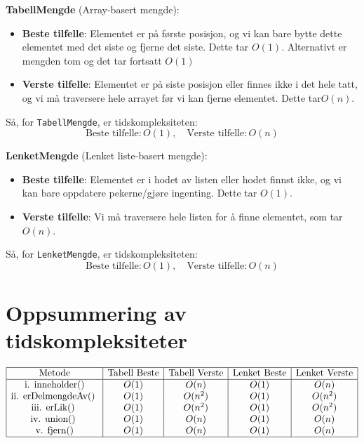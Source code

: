 \documentclass[12pt]{article}
\begin{document}
\textbf{TabellMengde} (Array-basert mengde):
\begin{itemize}
    \item \textbf{Beste tilfelle}: Elementet er på første posisjon,
        og vi kan bare bytte dette elementet med det siste og fjerne det siste. 
        Dette tar \(O(1)\). Alternativt er mengden tom og det tar fortsatt \(O(1)\)
    \item \textbf{Verste tilfelle}: Elementet er på siste posisjon eller finnes ikke i det hele tatt, og vi må traversere hele arrayet før vi kan fjerne elementet. Dette tar\(O(n)\).
\end{itemize}

Så, for \texttt{TabellMengde}, er tidskompleksiteten:
\[
\text{Beste tilfelle}: O(1), \quad \text{Verste tilfelle}: O(n)
\]

\textbf{LenketMengde} (Lenket liste-basert mengde):
\begin{itemize}
    \item \textbf{Beste tilfelle}: Elementet er i hodet av listen eller hodet finnst ikke,
        og vi kan bare oppdatere pekerne/gjøre ingenting. Dette tar \(O(1)\).
    \item \textbf{Verste tilfelle}: Vi må traversere hele listen for å finne elementet, som tar \(O(n)\).
\end{itemize}

Så, for \texttt{LenketMengde}, er tidskompleksiteten:
\[
\text{Beste tilfelle}: O(1), \quad \text{Verste tilfelle}: O(n)
\]

\section*{Oppsummering av tidskompleksiteter}

\[
\begin{array}{|c|c|c|c|c|}
\hline
\text{Metode} & \text{Tabell Beste} & \text{Tabell Verste} 
              & \text{Lenket Beste} 
              & \text{Lenket Verste} \\
\hline
\text{i. inneholder()} & O(1) & O(n) & O(1) & O(n) \\
\text{ii. erDelmengdeAv() } & O(1) & O(n^2) & O(1) & O(n^2) \\
\text{iii. erLik() } & O(1) & O(n^2) & O(1) & O(n^2) \\
\text{iv. union() } & O(1) & O(n) & O(1) & O(n) \\
\text{v. fjern()} & O(1) & O(n) & O(1) & O(n) \\
\hline
\end{array}
\]
\end{document}
